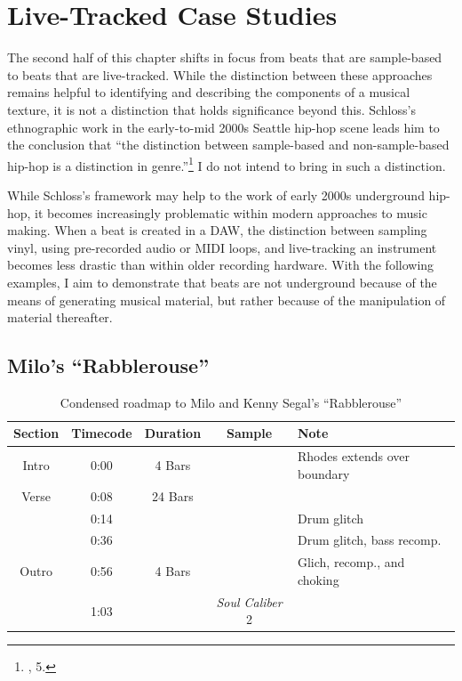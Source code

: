 \clearpage
\section{Live-Tracked Case Studies}
The second half of this chapter shifts in focus from beats that are sample-based to beats that are live-tracked. While the distinction between these approaches remains helpful to identifying and describing the components of a musical texture, it is not a distinction that holds significance beyond this. Schloss's ethnographic work in the early-to-mid 2000s Seattle hip-hop scene leads him to the conclusion that ``the distinction between sample-based and non-sample-based hip-hop is a distinction in genre.''\footnote{\cite{josephgschlossMakingBeatsArt2004}, 5.} I do not intend to bring in such a distinction.

While Schloss's framework may help to the work of early 2000s underground hip-hop, it becomes increasingly problematic within modern approaches to music making. When a beat is created in a DAW, the distinction between sampling vinyl, using pre-recorded audio or MIDI loops, and live-tracking an instrument becomes less drastic than within older recording hardware. With the following examples, I aim to demonstrate that beats are not underground because of the means of generating musical material, but rather because of the manipulation of material thereafter.

\subsection*{\centering Milo's ``Rabblerouse''}

\begin{table}[ht]
    \centering
        \begin{tabular}{|c|c|c|c|l|}
             \hline
            Section & Timecode & Duration & Sample                  & Note \\ \hline
            Intro   & 0:00     & 4 Bars   &                         & Rhodes extends over boundary \\ \hline
            Verse   & 0:08     & 24 Bars  &                         & \\ \hline
                    & 0:14     &          &                         & Drum glitch \\ \hline
                    & 0:36     &          &                         & Drum glitch, bass recomp. \\ \hline
            Outro   & 0:56     & 4 Bars   &                         & Glich, recomp., and choking \\ \hline
                    & 1:03     &          & \textit{Soul Caliber} 2 & \\ \hline
        \end{tabular}
    \caption{Condensed roadmap to Milo and Kenny Segal's ``Rabblerouse''}
    \label{tab:rabblerouse}
\end{table}

